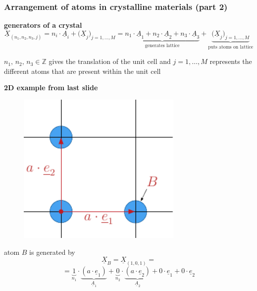 \begin{frame}
  \frametitle{Arrangement of atoms in crystalline materials (part 2)}

  \textbf{generators of a crystal}  \begin{displaymath}
    \underline{X}_{(n_1,n_2,n_3,j)} =
    n_i \cdot \underline{A}_i + \bigl( \underline{X}_j \bigr)_{j=1,\dots,M} =
    \underbrace{ n_1 \cdot \underline{A}_1 + n_2 \cdot \underline{A}_2 + n_3 \cdot \underline{A}_3 }_{\text{generates lattice}} + \underbrace{ \bigl( \underline{X}_j \bigr)_{j=1,\dots,M} }_{\text{puts atoms on lattice}}
  \end{displaymath}
    
  \vspace{-0.3em}
  $n_1, \, n_2, \, n_3 \in \mathbb{Z}$ gives the translation of the unit cell and \newline
  $j=1,\dots,M$ represents the different atoms that are present within the unit cell
  
  
  \vspace{1em}
  \textbf{2D example from last slide}
  \begin{multicols}{2}
    \noindent
    \begin{figure}
      \centering
      \includegraphics[width=8cm, keepaspectratio=true]{sections/cosserat_rods/images/CrystalLattice2DGeneratingFunction}
    \end{figure}
  
    atom $B$ is generated by
    \begin{displaymath}
      \underline{X}_B =
      \underline{X}_{(1,0,1)} =
    \end{displaymath}
    \begin{displaymath}
      = \underbrace{1}_{n_1} \cdot \underbrace{(a \cdot \underline{e}_1)}_{\underline{A}_1} +
      \underbrace{0}_{n_2} \cdot \underbrace{(a \cdot \underline{e}_2)}_{\underline{A}_2} +
      0 \cdot \underline{e}_1 +
      0 \cdot \underline{e}_2
    \end{displaymath}
  \end{multicols}

\end{frame}

